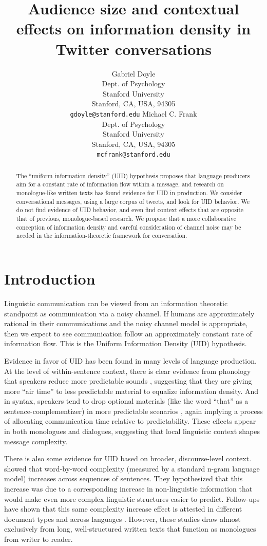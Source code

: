 \documentclass[11pt,letterpaper]{article}
\title{Audience size and contextual effects on information density in Twitter conversations}
\author{Gabriel Doyle\\
Dept. of Psychology\\
Stanford University\\
Stanford, CA, USA, 94305\\
{\tt gdoyle@stanford.edu}
	  \And
          Michael C. Frank\\
Dept. of Psychology\\
Stanford University\\
Stanford, CA, USA, 94305\\
{\tt mcfrank@stanford.edu}
}
\date{}
\begin{document}
\maketitle
\begin{abstract}
The ``uniform information density'' (UID) hypothesis proposes that language producers aim for a constant rate of information flow within a message, and research on monologue-like written texts has found evidence for UID in production.  We consider conversational messages, using a large corpus of tweets, and look for UID behavior.  We do not find evidence of UID behavior, and even find context effects that are opposite that of previous, monologue-based research.  We propose that a more collaborative conception of information density and careful consideration of channel noise may be needed in the information-theoretic framework for conversation.

\end{abstract}

\section{Introduction}

Linguistic communication can be viewed from an information theoretic standpoint as communication via a noisy channel.  If humans are approximately rational in their communications and the noisy channel model is appropriate, then we expect to see communication follow an approximately constant rate of information flow.  This is the Uniform Information Density (UID) hypothesis.

Evidence in favor of UID has been found in many levels of language production. At the level of within-sentence context, there is clear evidence from phonology that speakers reduce more predictable sounds \cite{aylett2004,aylett2006,bell2003,demberg2012}, suggesting that they are giving more ``air time'' to less predictable material to equalize information density. And in syntax, speakers tend to drop optional materials (like the word ``that'' as a sentence-complementizer) in more predictable scenarios \cite{levy2007,frank2008,jaeger2010}, again implying a process of allocating communication time relative to predictability. These effects appear in both monologues and dialogues, suggesting that local linguistic context shapes message complexity.

There is also some evidence for UID based on broader, discourse-level context.   showed that word-by-word complexity (measured by a standard n-gram language model) increases across sequences of sentences. They hypothesized that this increase was due to a corresponding increase in non-linguistic information that would make even more complex linguistic structures easier to predict. Follow-ups have shown that this same complexity increase effect is attested in different document types and across languages \cite{genzel2003,qian2012}. However, these studies draw almost exclusively from long, well-structured written texts that function as monologues from writer to reader.  
\end{document}
